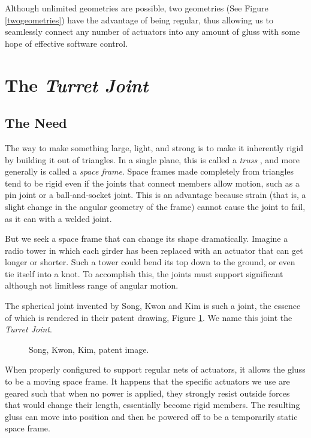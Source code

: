 \documentclass[11pt]{article}
\begin{document}
Although unlimited geometries are possible, two geometries (See Figure \ref{twogeometries}) 
have the advantage of being regular, thus allowing us to
seamlessly connect any number of actuators into any amount of gluss with some hope of effective software control.

\section{The \textit{Turret Joint}}

\subsection{The Need}

The way to make something large, light, and strong is to make it inherently rigid by building it
out of triangles. In a single plane, this is called a \emph{truss} \cite{ambrose1993building}, and more generally is called
a \emph{space frame}.  Space frames made completely from triangles tend to be rigid even if the
joints that connect members allow motion, such as a pin joint or a ball-and-socket joint. This
is an advantage because strain (that is, a slight change in the angular geometry of the frame) cannot cause
the joint to fail, as it can with a welded joint.

But we seek a space frame that can change its shape dramatically. Imagine a radio tower in which
each girder has been replaced with an actuator that can get longer or shorter. Such a tower could
bend its top down to the ground, or even
tie itself into a knot. To accomplish this, the joints must support significant although not
limitless range of angular motion. 

The spherical joint invented by Song, Kwon and Kim \cite{song2003spherical} is such a joint,
the essence of which is rendered in their patent drawing, Figure \ref{SongKwonKimImage}.
We name this joint the \emph{Turret Joint}.

\begin{figure}[!ht]
  \centering
    \caption[Song, Kwon, Kim, patent image.]{Song, Kwon, Kim, patent image.}
      \label{SongKwonKimImage}
\end{figure}

When properly configured to support regular nets of actuators,
it allows the gluss to be a moving space frame. It happens that the specific actuators we use
are geared such that when no power is applied, they strongly resist outside forces that would change their length,
essentially become rigid members.
The resulting gluss
can move into position and then be powered off to be a temporarily static space frame.
\end{document}
